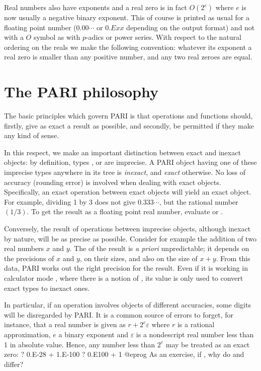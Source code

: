 Real numbers also have exponents and a real zero is in fact $O(2^e)$ where
$e$ is now usually a negative binary exponent. This of course is printed as
usual for a floating point number ($0.00\cdots$ or $0.Exx$ depending on the
output format) and not with a $O$ symbol as with $p$-adics or power series.
With respect to the natural ordering on the reals we make the following
convention: whatever its exponent a real zero is smaller than any positive
number, and any two real zeroes are equal.

\section{The PARI philosophy}
The basic principles which govern PARI is that operations and functions
should, firstly, give as exact a result as possible, and secondly, be
permitted if they make any kind of sense.

In this respect, we make an important distinction between exact and inexact
objects: by definition, types ,  or  are
imprecise. A PARI object having one of these imprecise types anywhere in
its tree is \emph{inexact}, and \emph{exact} otherwise. No loss of accuracy
(rounding error) is involved when dealing with exact objects. Specifically,
an exact operation between exact objects will yield an exact object. For
example, dividing 1 by 3 does not give $0.333\cdots$, but the rational number
$(1/3)$. To get the result as a floating point real number, evaluate
 or .

Conversely, the result of operations between imprecise objects, although
inexact by nature, will be as precise as possible. Consider for example the
addition of two real numbers $x$ and $y$. The  of the result is
\emph{a priori} unpredictable; it depends on the precisions of $x$ and $y$,
on their sizes, and also on the size of $x+y$. From this data, PARI works out
the right precision for the result. Even if it is working in calculator mode
, where there is a notion of , its value is
only used to convert exact types to inexact ones.

In particular, if an operation involves objects of different accuracies, some
digits will be disregarded by PARI. It is a common source of errors to
forget, for instance, that a real number is given as $r + 2^e \varepsilon$
where $r$ is a rational approximation, $e$ a binary exponent and
$\varepsilon$ is a nondescript real number less than 1 in absolute value.
Hence, any number less than $2^e$ may be treated as an exact zero:
\bprog
? 0.E-28 + 1.E-100
? 0.E100 + 1
@eprog
\noindent As an exercise, if , why do  and
 differ?

